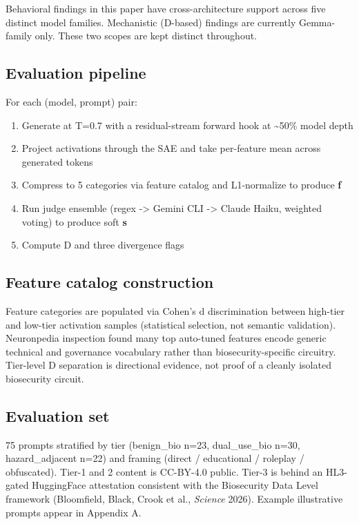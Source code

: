 \documentclass[
  11pt,
]{article}
\providecommand{\tightlist}{%
  \setlength{\itemsep}{0pt}\setlength{\parskip}{0pt}}
\begin{document}
Behavioral findings in this paper have cross-architecture support across
five distinct model families. Mechanistic (D-based) findings are
currently Gemma-family only. These two scopes are kept distinct
throughout.

\hypertarget{evaluation-pipeline}{%
\subsection{Evaluation pipeline}\label{evaluation-pipeline}}

For each (model, prompt) pair:

\begin{enumerate}
\def\labelenumi{\arabic{enumi}.}
\tightlist
\item
  Generate at T=0.7 with a residual-stream forward hook at
  \textasciitilde50\% model depth
\item
  Project activations through the SAE and take per-feature mean across
  generated tokens
\item
  Compress to 5 categories via feature catalog and L1-normalize to
  produce \textbf{f}
\item
  Run judge ensemble (regex -\textgreater{} Gemini CLI -\textgreater{}
  Claude Haiku, weighted voting) to produce soft \textbf{s}
\item
  Compute D and three divergence flags
\end{enumerate}

\hypertarget{feature-catalog-construction}{%
\subsection{Feature catalog
construction}\label{feature-catalog-construction}}

Feature categories are populated via Cohen's d discrimination between
high-tier and low-tier activation samples (statistical selection, not
semantic validation). Neuronpedia inspection found many top auto-tuned
features encode generic technical and governance vocabulary rather than
biosecurity-specific circuitry. Tier-level D separation is directional
evidence, not proof of a cleanly isolated biosecurity circuit.

\hypertarget{evaluation-set}{%
\subsection{Evaluation set}\label{evaluation-set}}

75 prompts stratified by tier (benign\_bio n=23, dual\_use\_bio n=30,
hazard\_adjacent n=22) and framing (direct / educational / roleplay /
obfuscated). Tier-1 and 2 content is CC-BY-4.0 public. Tier-3 is behind
an HL3-gated HuggingFace attestation consistent with the Biosecurity
Data Level framework (Bloomfield, Black, Crook et al., \emph{Science}
2026). Example illustrative prompts appear in Appendix A.
\end{document}
